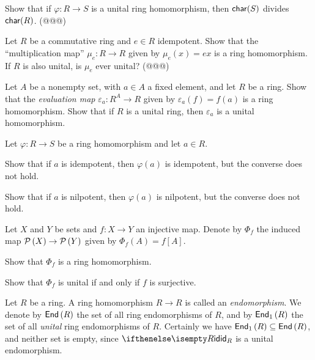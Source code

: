 \begin{exercise}
Show that if \(\varphi : R \rightarrow S\) is a unital ring homomorphism, then \(\mathsf{char}(S)\) divides \(\mathsf{char}(R)\). (@@@)
\end{exercise}

\begin{exercise}
Let \(R\) be a commutative ring and \(e \in R\) idempotent. Show that the ``multiplication map'' \(\mu_e : R \rightarrow R\) given by \(\mu_e(x) = ex\) is a ring homomorphism. If \(R\) is also unital, is \(\mu_e\) ever unital? (@@@)
\end{exercise}

\begin{exercise}
Let \(A\) be a nonempty set, with \(a \in A\) a fixed element, and let \(R\) be a ring. Show that the \emph{evaluation map} \(\varepsilon_a : R^A \rightarrow R\) given by \(\varepsilon_a(f) = f(a)\) is a ring homomorphism. Show that if \(R\) is a unital ring, then \(\varepsilon_a\) is a unital homomorphism.
\end{exercise}

\begin{exercise}
Let \(\varphi : R \rightarrow S\) be a ring homomorphism and let \(a \in R\).
\begin{proplist}
\item Show that if \(a\) is idempotent, then \(\varphi(a)\) is idempotent, but the converse does not hold.
\item Show that if \(a\) is nilpotent, then \(\varphi(a)\) is nilpotent, but the converse does not hold.
\end{proplist}
\end{exercise}

\begin{exercise}
Let \(X\) and \(Y\) be sets and \(f : X \rightarrow Y\) an injective map. Denote by \(\Phi_f\) the induced map \(\mathcal{P}\left(X\right) \rightarrow \mathcal{P}\left(Y\right)\) given by \(\Phi_f(A) = f[A]\).
\begin{proplist}
\item Show that \(\Phi_f\) is a ring homomorphism.
\item Show that \(\Phi_f\) is unital if and only if \(f\) is surjective.
\end{proplist}
\end{exercise}

\begin{dfn}[Endomorphism] \label{dfn:endo}
Let \(R\) be a ring. A ring homomorphism \(R \rightarrow R\) is called an  \emph{endomorphism}. We denote by \( \mathsf{End}\left(R\right) \) the set of all ring endomorphisms of \(R\), and by \( \mathsf{End}_1\left(R\right) \) the set of all \emph{unital} ring endomorphisms of \(R\). Certainly we have \( \mathsf{End}_1\left(R\right)  \subseteq  \mathsf{End}\left(R\right) \), and neither set is empty, since \(\ID[R]\) is a unital endomorphism.
\end{dfn}

